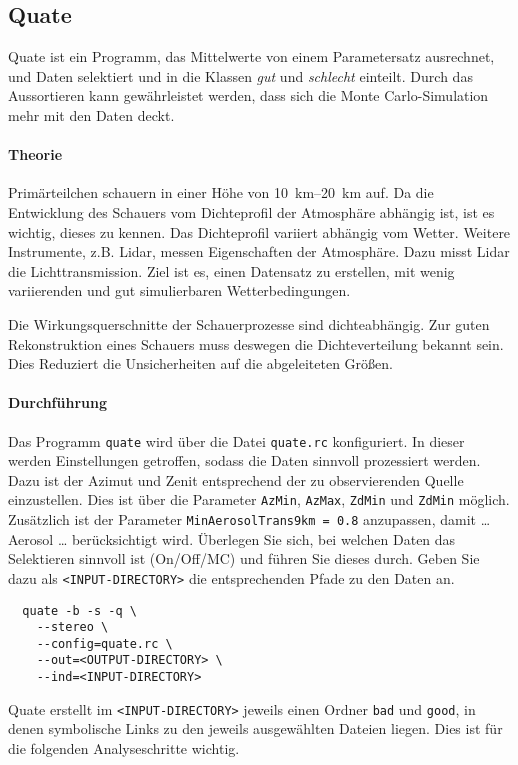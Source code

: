 \subsection{Quate}%
\label{sub:quate}

Quate ist ein Programm,
das Mittelwerte von einem Parametersatz ausrechnet,
und Daten selektiert und in die Klassen \textit{gut} und \textit{schlecht} einteilt.
Durch das Aussortieren kann gewährleistet werden,
dass sich die Monte Carlo-Simulation mehr mit den Daten deckt.

\paragraph{Theorie}%
Primärteilchen schauern in einer Höhe von \SIrange{10}{20}{\kilo\meter}
auf.
Da die Entwicklung des Schauers vom Dichteprofil der Atmosphäre abhängig ist,
ist es wichtig, dieses zu kennen.
Das Dichteprofil variiert abhängig vom Wetter.
Weitere Instrumente, z.B. Lidar, messen Eigenschaften der Atmosphäre.
Dazu misst Lidar die Lichttransmission.
Ziel ist es, einen Datensatz zu erstellen,
mit wenig variierenden und gut simulierbaren Wetterbedingungen.

Die Wirkungsquerschnitte der Schauerprozesse sind dichteabhängig.
Zur guten Rekonstruktion eines Schauers muss deswegen die Dichteverteilung
bekannt sein.
Dies Reduziert die Unsicherheiten auf die abgeleiteten Größen.

\paragraph{Durchführung}%

Das Programm \texttt{quate} wird über die
Datei \texttt{quate.rc} konfiguriert.
In dieser werden Einstellungen getroffen,
sodass die Daten sinnvoll prozessiert werden.
Dazu ist der Azimut und Zenit entsprechend der zu
observierenden Quelle einzustellen.
Dies ist über die Parameter \texttt{AzMin},
\texttt{AzMax}, \texttt{ZdMin} und \texttt{ZdMin}
möglich.
Zusätzlich ist der Parameter
\texttt{MinAerosolTrans9km = 0.8} anzupassen,
damit {\color{red}\ldots Aerosol \ldots} berücksichtigt wird.
Überlegen Sie sich,
bei welchen Daten das Selektieren sinnvoll ist
(On/Off/MC)
und führen Sie dieses durch.
Geben Sie dazu als \texttt{<INPUT-DIRECTORY>} die entsprechenden Pfade zu den Daten an.

\begin{lstlisting}
  quate -b -s -q \
    --stereo \
    --config=quate.rc \
    --out=<OUTPUT-DIRECTORY> \
    --ind=<INPUT-DIRECTORY>
\end{lstlisting}
Quate erstellt im \texttt{<INPUT-DIRECTORY>}
jeweils einen Ordner \texttt{bad} und \texttt{good},
in denen symbolische Links zu den jeweils ausgewählten Dateien liegen.
Dies ist für die folgenden Analyseschritte wichtig.
